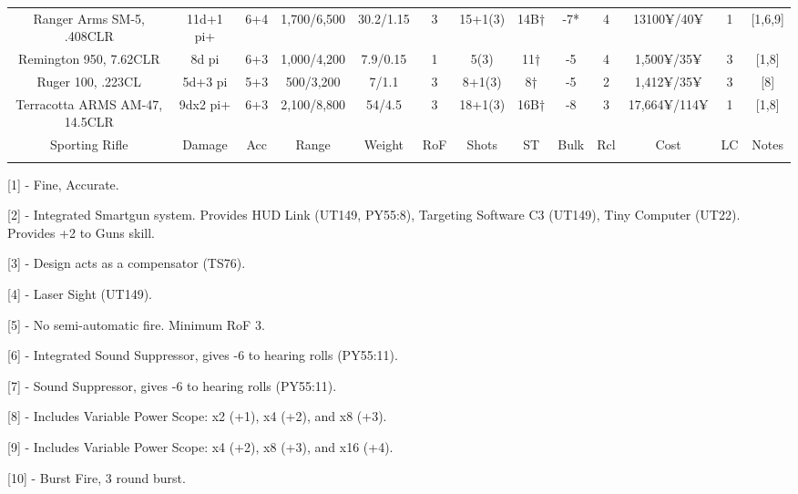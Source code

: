 \begin{center}
\begin{adjustwidth}{-8mm}{}
{\begin{tabular}{|c|c|c|c|c|c|c|c|c|c|c|c|c|}
				Ranger Arms SM-5, .408CLR & 11d+1 pi+ & 6+4 & 1,700/6,500 & 30.2/1.15 & 3 & 15+1(3) & 14B† & -7* & 4 & 13100¥/40¥  & 1 & [1,6,9] \\ 
				Remington 950, 7.62CLR &  8d pi & 6+3 & 1,000/4,200 & 7.9/0.15 & 1 & 5(3) & 11† & -5 & 4 & 1,500¥/35¥ & 3 & [1,8] \\
				Ruger 100, .223CL & 5d+3 pi & 5+3 & 500/3,200 & 7/1.1 & 3 & 8+1(3) & 8† & -5 & 2 & 1,412¥/35¥ & 3 & [8]\\
				Terracotta ARMS AM-47, 14.5CLR & 9dx2 pi+ & 6+3 & 2,100/8,800 &  54/4.5 & 3 & 18+1(3) & 16B† & -8 & 3 &  17,664¥/114¥ & 1 & [1,8] \\
				\hline
				Sporting Rifle & Damage & Acc & Range & Weight & RoF & Shots & ST & Bulk & Rcl & Cost & LC & Notes\\
				\hline
				\\
				\hline
			\end{tabular}
		}
	\end{adjustwidth}
\end{center}

[1] - Fine, Accurate.

[2] - Integrated Smartgun system. Provides HUD Link (UT149, PY55:8), Targeting Software C3 (UT149), Tiny Computer (UT22). Provides +2 to Guns skill.

[3] - Design acts as a compensator (TS76).

[4] - Laser Sight (UT149).

[5] - No semi-automatic fire. Minimum RoF 3.

[6] - Integrated Sound Suppressor, gives -6 to hearing rolls (PY55:11).

[7] - Sound Suppressor, gives -6 to hearing rolls (PY55:11).

[8] - Includes Variable Power Scope: x2 (+1), x4 (+2), and x8 (+3).

[9] - Includes Variable Power Scope: x4 (+2), x8 (+3), and x16 (+4).

[10] - Burst Fire, 3 round burst.

